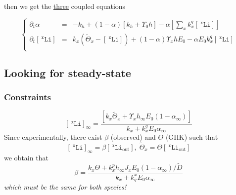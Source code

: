 \documentclass[aps,onecolumn,12pt]{revtex4}
\newcommand{\mychem}[1]{\mathtt{#1}}
\newcommand{\myconc}[1]{\left\lbrack{#1}\right\rbrack}
\newcommand{\spLi}[1]{{~^{\mychem{#1}}\mychem{Li}}}
\newcommand{\Li}[1]{\myconc{\spLi{#1}}}
\newcommand{\spLiOut}[1]{{\spLi{#1}}_{\mathrm{out}}}
\newcommand{\LiOut}[1]{\myconc{\spLiOut{#1}}}
\newcommand{\spproton}{\mychem{H}}
\newcommand{\proton}{\myconc{\spproton}}
\begin{document}
%


then we get the \underline{three} coupled equations

\begin{equation}
\boxed{
\left\lbrace
	\begin{array}{rcl}
		\partial_t\alpha & = & -k_h + \left(1- \alpha\right)\left\lbrack k_h+\Upsilon_0 h\right] - \alpha \left\lbrack {\sum_x k_x^q \Li{x}} \right\rbrack\\
		\partial_t\Li{x} & = & k_x \left(\tilde{\Theta}_x -\Li{x} \right)  + \left(1-\alpha\right) \Upsilon_x h  E_0 - \alpha E_0 k_x^q \Li{x}\\
	\end{array}
\right.
}
\end{equation}


\subsection{Looking for steady-state}
\subsubsection{Constraints}
\begin{equation}
	\Li{x}_\infty = \dfrac{\left\lbrack k_x\tilde{\Theta}_x+\Upsilon_x h_\infty E_0 \left(1-\alpha_\infty\right)\right\rbrack}{k_x+ k_x^q E_0\alpha_\infty}
\end{equation}
Since experimentally, there exist ${\beta}$ (observed) and $\Theta$ (GHK) such that
\begin{equation}
	\Li{x}_\infty=\beta\LiOut{x},\;\tilde{\Theta}_x = \Theta \LiOut{x}
\end{equation}
we obtain that
\begin{equation}
		\beta = \dfrac{k_x\Theta + k_x^p h_\infty {J_x} E_0 (1-\alpha_\infty)/\tilde{D}}{k_x+ k_q^x E_0\alpha_\infty}
\end{equation}
\textit{which must be the same for both species!}
\end{document}
